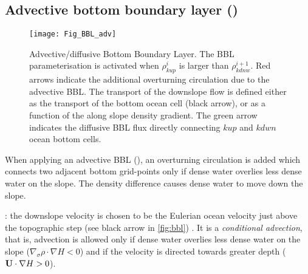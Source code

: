 \documentclass[../main/NEMO_manual]{subfiles}
\begin{document}
\subsection{Advective bottom boundary layer  (\protect{})}
\label{subsec:TRA_bbl_adv}


\begin{figure}[!t]
  \begin{center}
    \texttt{[image: Fig\_BBL\_adv]}
    \caption{
      \protect\label{fig:bbl}
      Advective/diffusive Bottom Boundary Layer.
      The BBL parameterisation is activated when $\rho^i_{kup}$ is larger than $\rho^{i+1}_{kdnw}$.
      Red arrows indicate the additional overturning circulation due to the advective BBL.
      The transport of the downslope flow is defined either as the transport of the bottom ocean cell (black arrow),
      or as a function of the along slope density gradient.
      The green arrow indicates the diffusive BBL flux directly connecting $kup$ and $kdwn$ ocean bottom cells.
    }
  \end{center}
\end{figure}




When applying an advective BBL (), an overturning circulation is added which
connects two adjacent bottom grid-points only if dense water overlies less dense water on the slope.
The density difference causes dense water to move down the slope. 

:
the downslope velocity is chosen to be the Eulerian ocean velocity just above the topographic step
(see black arrow in \autoref{fig:bbl}) \citep{Beckmann_Doscher1997}.
It is a \textit{conditional advection}, that is, advection is allowed only
if dense water overlies less dense water on the slope (\ie $\nabla_\sigma \rho  \cdot  \nabla H<0$) and
if the velocity is directed towards greater depth (\ie $\mathbf{U}  \cdot  \nabla H>0$).
\end{document}
